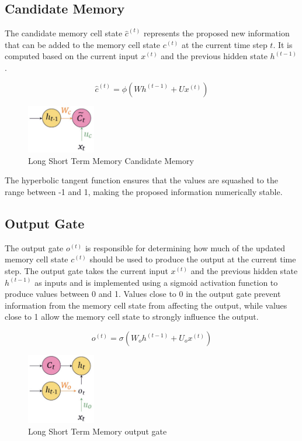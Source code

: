 \newpage
\subsection{Candidate Memory}

The candidate memory cell state $\hat{c}^{(t)}$ represents the proposed new information that can be added to the memory cell state $c^{(t)}$ at the current time step $t$. It is computed based on the current input $x^{(t)}$ and the previous hidden state $h^{(t-1)}$.

$$ \hat{c}^{(t)} = \phi \left( W h^{(t-1)} + U x^{(t)} \right) $$

\begin{figure}[h]
    \centering
    \includegraphics[width=3cm]{Images/lstm-candidate-memory.png}
    \caption{Long Short Term Memory Candidate Memory}
    \label{fig:lstm-candidate-memory}
\end{figure}

\noindent The hyperbolic tangent function ensures that the values are squashed to the range between -1 and 1, making the proposed information numerically stable. 

\subsection{Output Gate}

The output gate $o^{(t)}$ is responsible for determining how much of the updated memory cell state $c^{(t)}$ should be used to produce the output at the current time step. The output gate takes the current input $x^{(t)}$ and the previous hidden state $h^{(t-1)}$ as inputs and is implemented using a sigmoid activation function to produce values between 0 and 1. Values close to 0 in the output gate prevent information from the memory cell state from affecting the output, while values close to 1 allow the memory cell state to strongly influence the output.

$$ o^{(t)} = \sigma \left( W_o h^{(t-1)} + U_o x^{(t)}     \right)   $$

\begin{figure}[h]
    \centering
    \includegraphics[width=3cm]{Images/lstm-output-gate.png}
    \caption{Long Short Term Memory output gate}
    \label{fig:lstm-output-gate}
\end{figure}

